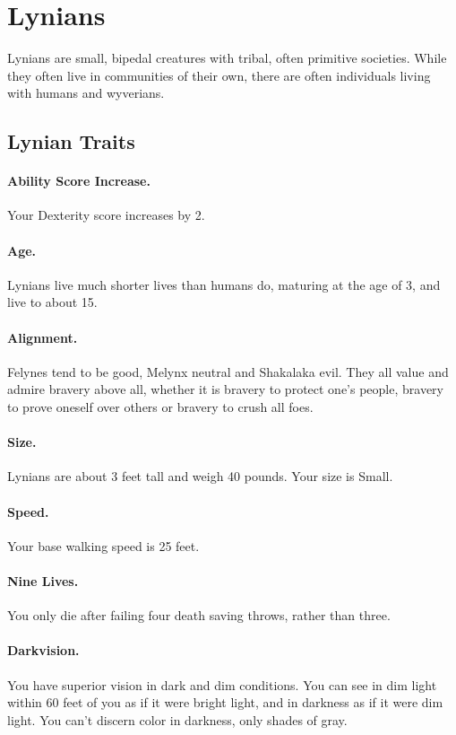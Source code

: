 \section{Lynians}
Lynians are small, bipedal creatures with tribal, often primitive societies.  While they often live in communities of their own, there are often individuals living with humans and wyverians.

\subsection*{Lynian Traits}
\paragraph{Ability Score Increase.} Your Dexterity score increases by 2.

\paragraph{Age.} Lynians live much shorter lives than humans do, maturing at the age of 3, and live to about 15.

\paragraph{Alignment.} Felynes tend to be good, Melynx neutral and Shakalaka evil. They all value and admire bravery above all, whether it is bravery to protect one's people, bravery to prove oneself over others or bravery to crush all foes.

\paragraph{Size.} Lynians are about 3 feet tall and weigh 40 pounds. Your size is Small.
\hbWideBottomArtFirstPageFix

\paragraph{Speed.} Your base walking speed is 25 feet.

\paragraph{Nine Lives.} You only die after failing four death saving throws, rather than three.

\paragraph{Darkvision.} You have superior vision in dark and dim conditions. You can see in dim light within 60 feet of you as if it were bright light, and in darkness as if it were dim light. You can't discern color in darkness, only shades of gray.

